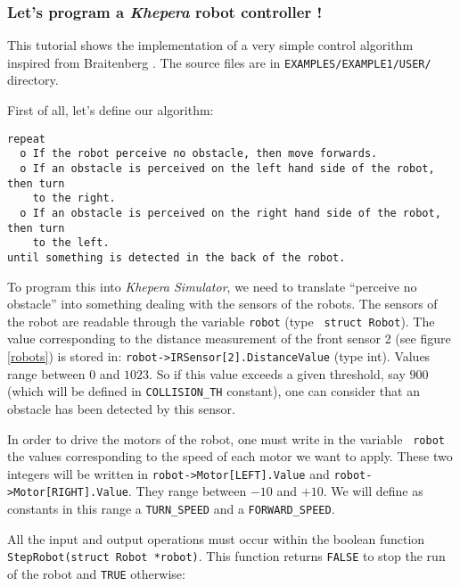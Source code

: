 \documentclass[a4paper,twoside]{article}
\begin{document}
\subsubsection{Let's program a {\em Khepera} robot controller !}

This tutorial shows the implementation of a very simple control algorithm
inspired from Braitenberg \cite{BRAITENBERG84}. The source files are in
{\tt EXAMPLES/EXAMPLE1/USER/} directory.

First of all, let's define our algorithm:

\begin{verbatim}
repeat
  o If the robot perceive no obstacle, then move forwards.
  o If an obstacle is perceived on the left hand side of the robot, then turn
    to the right.
  o If an obstacle is perceived on the right hand side of the robot, then turn
    to the left. 
until something is detected in the back of the robot.
\end{verbatim}

To program this into {\em Khepera Simulator}, we need to translate ``perceive
no obstacle'' into something dealing with the sensors of the robots. The
sensors of the robot are readable through the variable {\tt robot} (type {\tt
struct Robot}). The value corresponding to the distance measurement of the
front sensor 2 (see figure \ref{robots}) is stored in:
{\tt robot->IRSensor[2].DistanceValue} (type int). Values range between $0$
and $1023$. So if this value exceeds a given threshold, say $900$ (which will
be defined in {\tt COLLISION\_TH} constant), one can consider that an obstacle
has been detected by this sensor.

In order to drive the motors of the robot, one must write in the variable {\tt
robot} the values corresponding to the speed of each motor we want to
apply. These two integers will be written in {\tt robot->Motor[LEFT].Value}
and {\tt robot->Motor[RIGHT].Value}. They range between $-10$ and $+10$. We
will define as constants in this range a {\tt TURN\_SPEED} and a {\tt FORWARD\_SPEED}.

All the input and output operations must occur within the boolean function
{\tt StepRobot(struct Robot *robot)}. This function returns {\tt FALSE} to
stop the run of the robot and {\tt TRUE} otherwise:
\end{document}
